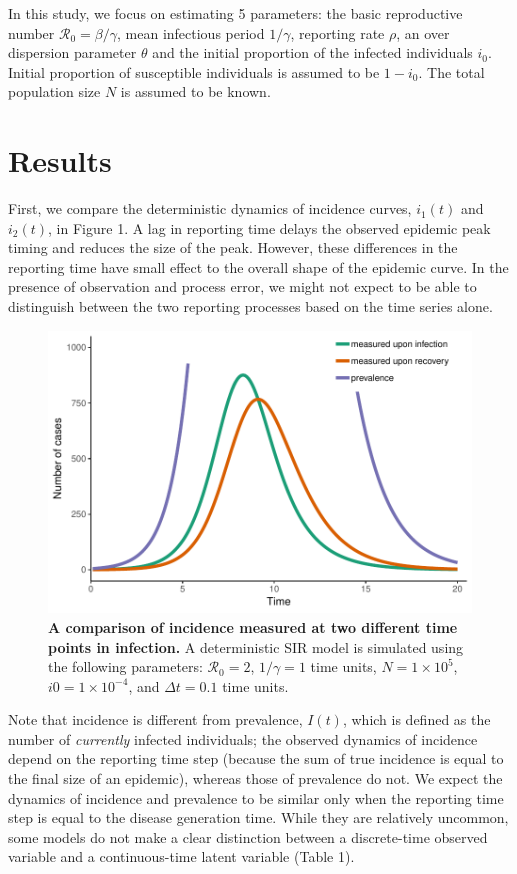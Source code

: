 \documentclass{article}\usepackage[]{graphicx}\usepackage[]{color}
\begin{document}
In this study, we focus on estimating 5 parameters: the basic reproductive
number $\mathcal R_0 = \beta/\gamma$, mean infectious period $1/\gamma$, 
reporting rate $\rho$, an over dispersion parameter $\theta$ and the initial
proportion of the infected individuals $i_0$. Initial proportion of
susceptible individuals is assumed to be $1 - i_0$. The total population
size $N$ is assumed to be known.

\section{Results}

First, we compare the deterministic dynamics of incidence curves,
$i_1(t)$ and $i_2(t)$, in Figure 1. A lag in reporting time delays
the observed epidemic peak timing and reduces the size of the peak. However, 
these differences in the reporting time have small effect to the overall shape 
of the epidemic curve. In the presence of observation and process error, we 
might not expect to be able to distinguish between the two reporting processes
based on the time series alone. 

\begin{figure}[!t]
\includegraphics[width=\textwidth]{../figure/example.pdf}
\caption{
\textbf{A comparison of incidence measured at two different time points in infection.}
A deterministic SIR model is simulated using the following parameters: 
$\mathcal R_0 = 2$, $1/\gamma = 1$ time units, $N = 1 \times 10^5$, $i0 = 1 \times 10^{-4}$,
and $\Delta t = 0.1$ time units.
}
\end{figure}

Note that incidence is different from prevalence,
$I(t)$, which is defined as the number of \emph{currently} infected individuals;
the observed dynamics of incidence depend on the reporting time step (because the sum of 
true incidence is equal to the final size of an epidemic), whereas those of
prevalence do not. We expect the dynamics of incidence and prevalence to be similar only when
the reporting time step is equal to the disease generation time. While they are relatively
uncommon, some models do not make a clear distinction between a discrete-time observed 
variable and a continuous-time latent variable (Table 1).
\end{document}
